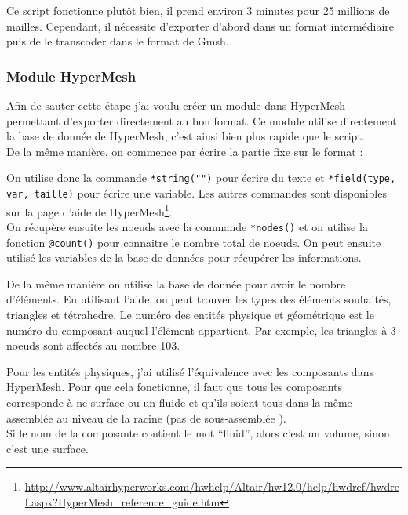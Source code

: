 Ce script fonctionne plutôt bien, il prend environ 3 minutes pour 25 millions de mailles. Cependant, il nécessite d'exporter d'abord dans un format intermédiaire puis de le transcoder dans le format de Gmsh. 

\subsubsection{Module HyperMesh} 

Afin de sauter cette étape j'ai voulu créer un module dans HyperMesh permettant d'exporter directement au bon format. Ce module utilise directement la base de donnée de HyperMesh, c'est ainsi bien plus rapide que le script.\\
De la même manière, on commence par écrire la partie fixe sur le format :


On utilise donc la commande \texttt{*string("")} pour écrire du texte et \texttt{*field(type, var, taille)} pour écrire une variable. Les autres commandes sont disponibles sur la page d'aide de HyperMesh\footnote{\url{http://www.altairhyperworks.com/hwhelp/Altair/hw12.0/help/hwdref/hwdref.aspx?HyperMesh\_reference\_guide.htm}}.\\
On récupère ensuite les noeuds avec la commande \texttt{*nodes()} et on utilise la fonction \texttt{@count()} pour connaitre le nombre total de noeuds. On peut ensuite utilisé les variables de la base de données pour récupérer les informations.


De la même manière on utilise la base de donnée pour avoir le nombre d'éléments. En utilisant l'aide, on peut trouver les types des éléments souhaités, triangles et tétrahedre. Le numéro des entités physique et géométrique est le numéro du composant auquel l'élément appartient. Par exemple, les triangles à 3 noeuds sont affectés au nombre 103.


Pour les entités physiques, j'ai utilisé l'équivalence avec les composants dans HyperMesh. Pour que cela fonctionne, il faut que tous les composants corresponde à ne surface ou un fluide et qu'ils soient tous dans la même assemblée au niveau de la racine (pas de sous-assemblée ).\\
Si le nom de la composante contient le mot ``fluid'', alors c'est un volume, sinon c'est une surface.

